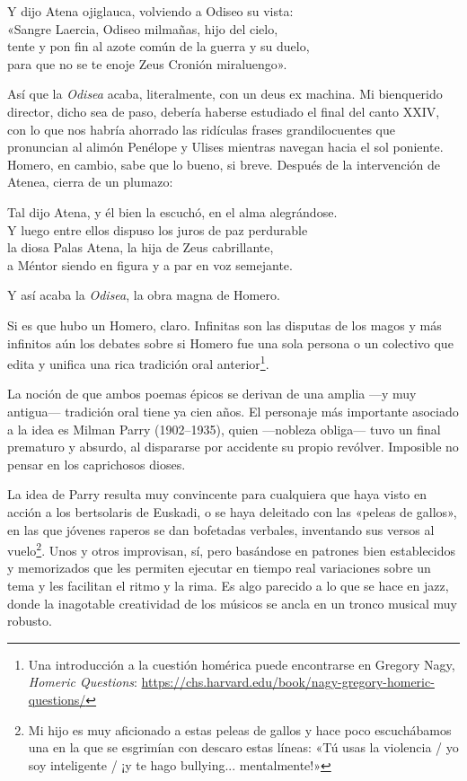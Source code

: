 \begin{versocita}
Y dijo Atena ojiglauca, volviendo a Odiseo su vista:\\
«Sangre Laercia, Odiseo milmañas, hijo del cielo,\\
tente y pon fin al azote común de la guerra y su duelo,\\
para que no se te enoje Zeus Cronión miraluengo».
\end{versocita}

Así que la \emph{Odisea} acaba, literalmente, con un deus ex machina. Mi bienquerido director, dicho sea de paso, debería haberse estudiado el final del canto XXIV, con lo que nos habría ahorrado las ridículas frases grandilocuentes que pronuncian al alimón Penélope y Ulises mientras navegan hacia el sol poniente. Homero, en cambio, sabe que lo bueno, si breve. Después de la intervención de Atenea, cierra de un plumazo:

\begin{versocita}
Tal dijo Atena, y él bien la escuchó, en el alma alegrándose.\\
Y luego entre ellos dispuso los juros de paz perdurable\\
la diosa Palas Atena, la hija de Zeus cabrillante,\\
a Méntor siendo en figura y a par en voz semejante.
\end{versocita}

Y así acaba la \emph{Odisea}, la obra magna de Homero.

Si es que hubo un Homero, claro. Infinitas son las disputas de los magos y más infinitos aún los debates sobre si Homero fue una sola persona o un colectivo que edita y unifica una rica tradición oral anterior\footnote{Una introducción a la cuestión homérica puede encontrarse en Gregory Nagy, \emph{Homeric Questions}: \url{https://chs.harvard.edu/book/nagy-gregory-homeric-questions/}}.

La noción de que ambos poemas épicos se derivan de una amplia ---y muy antigua--- tradición oral tiene ya cien años. El personaje más importante asociado a la idea es Milman Parry (1902--1935), quien ---nobleza obliga--- tuvo un final prematuro y absurdo, al dispararse por accidente su propio revólver. Imposible no pensar en los caprichosos dioses.

La idea de Parry resulta muy convincente para cualquiera que haya visto en acción a los bertsolaris de Euskadi, o se haya deleitado con las «peleas de gallos», en las que jóvenes raperos se dan bofetadas verbales, inventando sus versos al vuelo\footnote{Mi hijo es muy aficionado a estas peleas de gallos y hace poco escuchábamos una en la que se esgrimían con descaro estas líneas: «Tú usas la violencia / yo soy inteligente / ¡y te hago bullying... mentalmente!»}. Unos y otros improvisan, sí, pero basándose en patrones bien establecidos y memorizados que les permiten ejecutar en tiempo real variaciones sobre un tema y les facilitan el ritmo y la rima. Es algo parecido a lo que se hace en jazz, donde la inagotable creatividad de los músicos se ancla en un tronco musical muy robusto.

